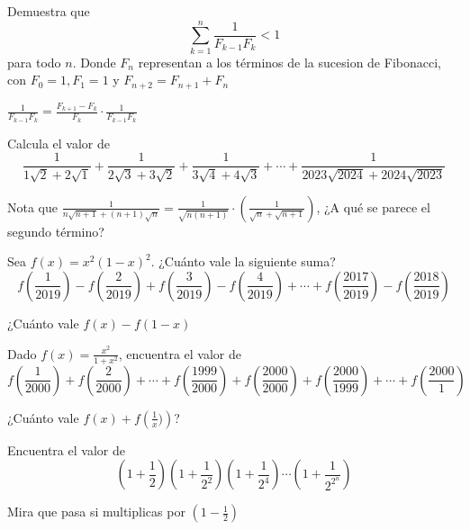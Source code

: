 \documentclass[11pt]{scrartcl}
\begin{document}
    \begin{problem}
        Demuestra que 
        \[\sum_{k=1}^n\frac{1}{F_{k-1}F_{k}}<1\]
        para todo $n$. Donde $F_n$ representan a los términos de la sucesion de Fibonacci, con $F_0=1, F_1=1$ y $F_{n+2}=F_{n+1}+F_{n}$
        \begin{hint}
            $\frac{1}{F_{k-1}F_k}=\frac{F_{k+1}-F_k}{F_k}\cdot \frac{1}{F_{k-1}F_k}$
        \end{hint}
    \end{problem} \hspace{0.2cm}
    \begin{problem}
        Calcula el valor de 
        \[\frac{1}{1\sqrt{2}+2\sqrt{1}}+\frac{1}{2\sqrt{3}+3\sqrt{2}}+\frac{1}{3\sqrt{4}+4\sqrt{3}}+\cdots+\frac{1}{2023\sqrt{2024}+2024\sqrt{2023}}\]
        \begin{hint}
            Nota que $\frac{1}{n\sqrt{n+1}+(n+1)\sqrt{n}}=\frac{1}{\sqrt{n(n+1)}}\cdot\left(\frac{1}{\sqrt{n}+\sqrt{n+1}}\right)$, ¿A qué se parece el segundo término?
        \end{hint}
        \end{problem}
        \begin{problem}
            Sea $f(x) = x^{2}(1-x)^{2}$. ¿Cuánto vale la siguiente suma?
\[f\left(\frac{1}{2019}\right)-f\left(\frac{2}{2019}\right)+f\left(\frac{3}{2019}\right)-f\left(\frac{4}{2019}\right)+\cdots
+f\left(\frac{2017}{2019}\right) - f\left(\frac{2018}{2019}\right)\]
\begin{hint}
    ¿Cuánto vale $f(x)-f(1-x)$
\end{hint}
\end{problem} \hspace{0.2cm}
\begin{problem}
     Dado $f(x)=\frac{x^2}{1+x^2}$, encuentra el valor de 
\[f\left( \frac{1}{2000} \right)+f\left( \frac{2}{2000} \right)+\cdots+ f\left( \frac{1999}{2000} \right)+f\left( \frac{2000}{2000} \right)+f\left( \frac{2000}{1999} \right)+\cdots+f\left( \frac{2000}{1} \right)\]
\begin{hint}
    ¿Cuánto vale $f(x)+f\left(\frac{1}{x})\right)$?
\end{hint}
        \end{problem} \hspace{0.2cm}
   \begin{problem}
       Encuentra el valor de \[\left(1+\frac{1}{2}\right)\left(1+\frac{1}{2^2}\right)\left(1+\frac{1}{2^4}\right)\cdots \left(1+\frac{1}{2^{2^n}}\right)\]
       \begin{hint}
           Mira que pasa si multiplicas por $\left(1-\frac{1}{2}\right)$
       \end{hint}
   \end{problem}
\end{document}
